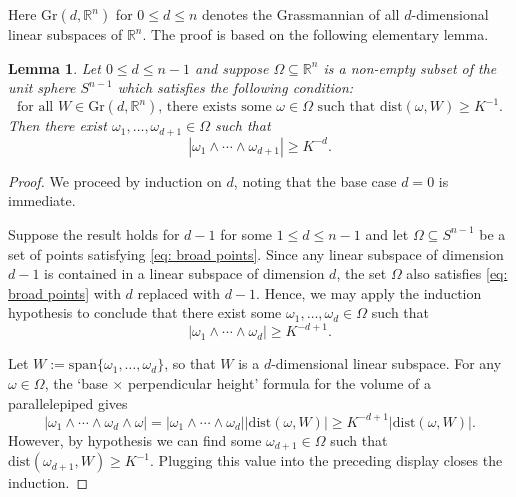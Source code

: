 \documentclass[reqno]{amsart}
\numberwithin{equation}{section}
\newcommand{\R}{\mathbb{R}}
\theoremstyle{plain}
\newtheorem{lemma}[theorem]{Lemma}
\theoremstyle{definition}
\newcommand{\dist}{\mathrm{dist}}
\begin{document}
Here $\mathrm{Gr}(d,\R^n)$ for $0 \leq d \leq n$ denotes the Grassmannian of all $d$-dimensional linear subspaces of $\R^n$. The proof is based on the following elementary lemma. 

\begin{lemma}\label{lem: transversality} Let $0 \leq d \leq n-1$ and suppose $\Omega \subseteq \R^n$ is a non-empty subset of the unit sphere $S^{n-1}$ which satisfies the following condition:
\begin{equation}\label{eq: broad points}
    \textrm{for all $W \in \mathrm{Gr}(d,\R^n)$, there exists some $\omega \in \Omega$ such that $\dist(\omega, W) \geq K^{-1}$.}
\end{equation}
Then there exist $\omega_1, \dots, \omega_{d+1} \in \Omega$ such that 
\begin{equation*}
    |\omega_1 \wedge \cdots \wedge \omega_{d+1}| \geq K^{-d}.
\end{equation*}
\end{lemma}

\begin{proof} We proceed by induction on $d$, noting that the base case $d = 0$ is immediate. 

Suppose the result holds for $d-1$ for some $1 \leq d \leq n-1$ and let $\Omega \subseteq S^{n-1}$ be a set of points satisfying \eqref{eq: broad points}. Since any linear subspace of dimension $d-1$ is contained in a linear subspace of dimension $d$, the set $\Omega$ also satisfies \eqref{eq: broad points} with $d$ replaced with $d-1$. Hence, we may apply the induction hypothesis to conclude that there exist some $\omega_1, \dots, \omega_d \in \Omega$ such that
\begin{equation*}
    |\omega_1 \wedge \cdots \wedge \omega_d| \geq K^{-d+1}. 
\end{equation*}

Let $W := \mathrm{span}\{\omega_1, \dots, \omega_d\}$, so that $W$ is a $d$-dimensional linear subspace. For any $\omega \in \Omega$, the `base $\times$ perpendicular height' formula for the volume of a parallelepiped gives
\begin{equation*}
  | \omega_1 \wedge \cdots \wedge \omega_d \wedge \omega | =   |\omega_1 \wedge \cdots \wedge \omega_d| |\dist(\omega, W)| \geq K^{-d+1} |\dist(\omega, W)|.
\end{equation*}
However, by hypothesis we can find some $\omega_{d+1} \in \Omega$ such that $\dist(\omega_{d+1}, W) \geq K^{-1}$. Plugging this value into the preceding display closes the induction. 
\end{proof}
\end{document}
